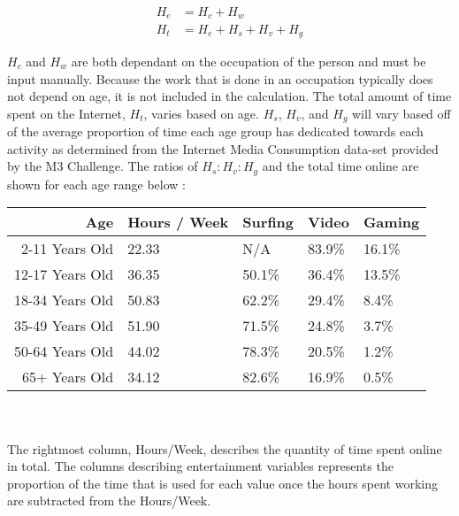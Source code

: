 \documentclass[12pt]{article}
\begin{document}
\begin{align*}
   H_e &= H_c + H_w \\
   H_t &= H_e + H_s + H_v + H_g
\end{align*}

$H_c$ and $H_w$ are both dependant on the occupation of the person and must be input manually. Because the work that is done in an occupation typically does not depend on age, it is not included in the calculation. The total amount of time spent on the Internet, $H_t$, varies based on age. $H_s$, $H_v$, and $H_g$ will vary based off of the average proportion of time each age group has dedicated towards each activity as determined from the Internet Media Consumption data-set provided by the M3 Challenge. The ratios of $H_s:H_v:H_g$ and the total time online are shown for each age range below \cite{m3} \cite{census}:

\begin{tabular}{|r|p{1.124in}|p{1.124in}|p{1.124in}|p{1.124in}|}
\hline
\textbf{Age} & \textbf{Hours / Week} & \textbf{Surfing} & \textbf{Video} & \textbf{Gaming}
\\
\hline
2-11 Years Old & 22.33 & N/A & 83.9\% & 16.1\%
\\
\hline
12-17 Years Old & 36.35 & 50.1\% & 36.4\% & 13.5\% 
\\
\hline
18-34 Years Old & 50.83 & 62.2\% & 29.4\% & 8.4\% 
\\
\hline
35-49 Years Old & 51.90 & 71.5\% & 24.8\% & 3.7\% 
\\
\hline
50-64 Years Old & 44.02 & 78.3\% & 20.5\% & 1.2\% 
\\
\hline
65+ Years Old & 34.12 & 82.6\% & 16.9\% & 0.5\% 
\\
\hline
\end{tabular}
\\
\\
The rightmost column, Hours/Week, describes the quantity of time spent online in total. The columns describing entertainment variables represents the proportion of the time that is used for each value once the hours spent working are subtracted from the Hours/Week.
\end{document}
